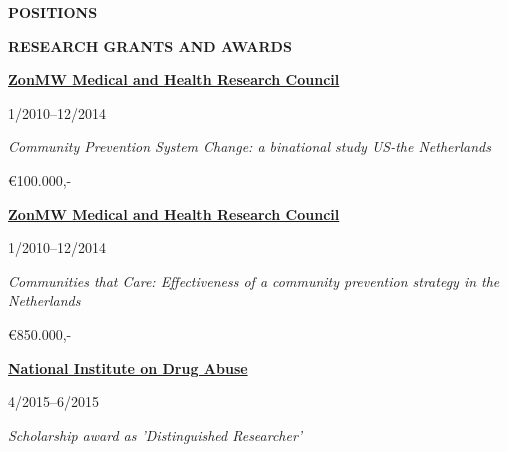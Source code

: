 \documentclass[
  16,
]{article}
\begin{document}
\begin{large}{\bf POSITIONS}
\begin{large}{\bf RESEARCH GRANTS AND AWARDS}
\begin{multicols}{2}
    \begin{flushleft}{\bf \href{https://www.zonmw.nl/nl/}{ZonMW Medical and Health Research Council}}\end{flushleft}
    \begin{flushright}1/2010–12/2014\end{flushright}
  \end{multicols}
  \vspace{-0.17cm}
  \begin{multicols}{2}
    \begin{flushleft}\textit{Community Prevention System Change: a binational study US-the Netherlands}\end
    {flushleft}
    \begin{flushright}€100.000,-   \end
    {flushright}
  \end{multicols}

\vspace{7pt}


\begin{multicols}{2}
    \begin{flushleft}{\bf \href{https://www.zonmw.nl/nl/}{ZonMW Medical and Health Research Council}}\end{flushleft}
    \begin{flushright}1/2010–12/2014\end{flushright}
  \end{multicols}
  \vspace{-0.17cm}
  \begin{multicols}{2}
    \begin{flushleft}\textit{Communities that Care: Effectiveness of a community prevention strategy in the Netherlands}\end
    {flushleft}
    \begin{flushright}€850.000,-  \end
    {flushright}
  \end{multicols}

\vspace{7pt}



\begin{multicols}{2}
    \begin{flushleft}{\bf \href{https://nida.nih.gov/}{National Institute on Drug Abuse}}\end{flushleft}
    \begin{flushright}4/2015–6/2015\end{flushright}
  \end{multicols}
  \vspace{-0.17cm}
  \begin{multicols}{2}
    \begin{flushleft}\textit{ Scholarship award as 'Distinguished Researcher'}
    \end{flushleft}
  \end{multicols}
\end{large}


\end{large}
\end{document}
